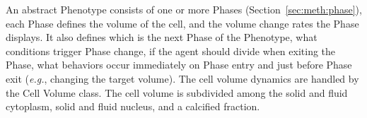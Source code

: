 


An abstract Phenotype consists of one or more Phases (Section~\ref{sec:meth:phase}), each Phase defines the volume of the cell, and the volume change rates the Phase displays. It also defines which is the next Phase of the Phenotype, what conditions trigger Phase change, if the agent should divide when exiting the Phase, what behaviors occur immediately on Phase entry and just before Phase exit (\textit{e.g.}, changing the target volume). The cell volume dynamics are handled by the Cell Volume class. The cell volume is subdivided among the solid and fluid cytoplasm, solid and fluid nucleus, and a calcified fraction.

